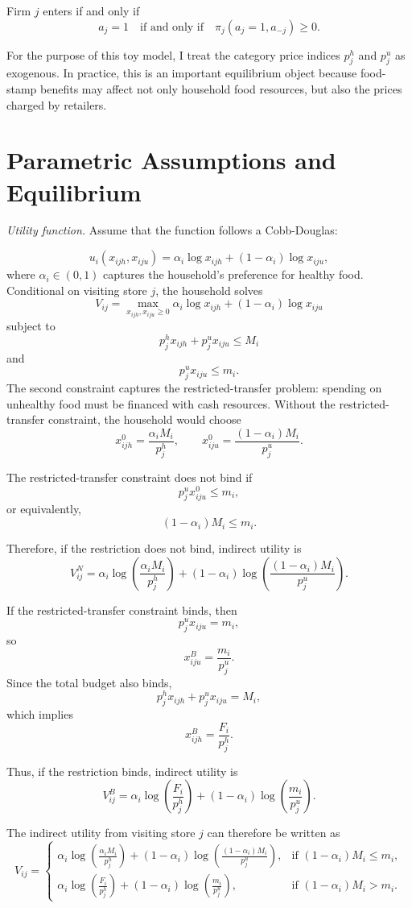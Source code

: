 \documentclass[12pt]{article}
\begin{document}
Firm $j$ enters if and only if
\[
a_j=1
\quad \text{if and only if} \quad
\pi_j(a_j=1,a_{-j})\geq 0.
\]

For the purpose of this toy model, I treat the category price indices $p^h_j$ and
$p^u_j$ as exogenous. In practice, this is an important equilibrium object because
food-stamp benefits may affect not only household food resources, but also the prices
charged by retailers.

\section{Parametric Assumptions and Equilibrium}

\textit{Utility function.} Assume that the function follows a Cobb-Douglas:

\[
u_i(x_{ijh},x_{iju})
=
\alpha_i \log x_{ijh}
+
(1-\alpha_i)\log x_{iju},
\]
where $\alpha_i\in(0,1)$ captures the household's preference for healthy food. Conditional on visiting store $j$, the household solves
\[
V_{ij}
=
\max_{x_{ijh},x_{iju}\geq 0}
\alpha_i \log x_{ijh}
+
(1-\alpha_i)\log x_{iju}
\]
subject to
\[
p^h_jx_{ijh}+p^u_jx_{iju}\leq M_i
\]
and
\[
p^u_jx_{iju}\leq  m_i.
\]
The second constraint captures the restricted-transfer problem: spending on unhealthy
food must be financed with cash resources. Without the restricted-transfer constraint, the household would choose
\[
x^0_{ijh}
=
\frac{\alpha_i M_i}{p^h_j},
\qquad
x^0_{iju}
=
\frac{(1-\alpha_i)M_i}{p^u_j}.
\]

The restricted-transfer constraint does not bind if
\[
p^u_jx^0_{iju}\leq m_i,
\]
or equivalently,
\[
(1-\alpha_i)M_i\leq  m_i.
\]

Therefore, if the restriction does not bind, indirect utility is
\[
V^N_{ij}
=
\alpha_i
\log\left(
\frac{\alpha_i M_i}{p^h_j}
\right)
+
(1-\alpha_i)
\log\left(
\frac{(1-\alpha_i)M_i}{p^u_j}
\right).
\]


If the restricted-transfer constraint binds, then
\[
p^u_jx_{iju}=m_i,
\]
so
\[
x^B_{iju}
=
\frac{m_i}{p^u_j}.
\]
Since the total budget also binds,
\[
p^h_jx_{ijh}+p^u_jx_{iju}=M_i,
\]
which implies
\[
x^B_{ijh}
=
\frac{F_i}{p^h_j}.
\]

Thus, if the restriction binds, indirect utility is
\[
V^B_{ij}
=
\alpha_i
\log\left(
\frac{F_i}{p^h_j}
\right)
+
(1-\alpha_i)
\log\left(
\frac{m_i}{p^u_j}
\right).
\]

The indirect utility from visiting store $j$ can therefore be written as
\[
V_{ij}
=
\begin{cases}
\alpha_i\log\left(\frac{\alpha_i M_i}{p^h_j}\right)
+
(1-\alpha_i)\log\left(\frac{(1-\alpha_i)M_i}{p^u_j}\right),
&
\text{if } (1-\alpha_i)M_i\leq m_i,
\\[1em]
\alpha_i\log\left(\frac{F_i}{p^h_j}\right)
+
(1-\alpha_i)\log\left(\frac{m_i}{p^u_j}\right),
&
\text{if } (1-\alpha_i)M_i>m_i.
\end{cases}
\]
\end{document}
